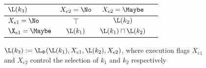 \begin{figure}%
\begin{center}
\begin{tabular}{|l||c|c|c|}
\hline
$\L(k_3)$ & $X_{e2} = \No$ & $X_{e2} = \Maybe $  \\
\hline \hline
$X_{e1} = \No$ & $\top$ & $\L(k_2)$   \\
\hline
$\X_{e1} = \Maybe$ & $\L(k_1)$ & $\L(k_1) \sqcap \L(k_2)$    \\
\hline
\end{tabular}
\end{center}
\caption{$\L(k_3) := \L_{\Phi}(\L(k_1), X_{e1}, \L(k_2), X_{e2} )$, where execution flags $X_{e1}$ and
$X_{e2}$ control the selection of $k_1$ and $k_2$ respectively}
\label{fig:phi}
\end{figure}


